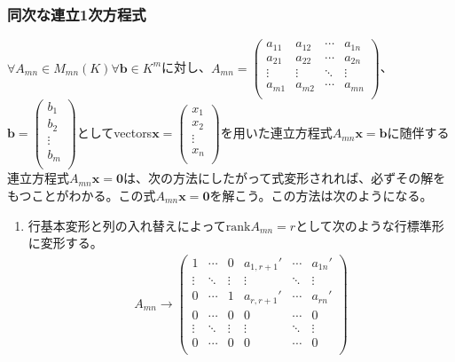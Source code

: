 \documentclass[dvipdfmx]{jsarticle}
\begin{document}
\subsubsection{同次な連立1次方程式}%
\begin{thm}\label{2.1.8.4}
$\forall A_{mn} \in M_{mn}(K)\forall\mathbf{b} \in K^{m}$に対し、$A_{mn} = \begin{pmatrix}
a_{11} & a_{12} & \cdots & a_{1n} \\
a_{21} & a_{22} & \cdots & a_{2n} \\
 \vdots & \vdots & \ddots & \vdots \\
a_{m1} & a_{m2} & \cdots & a_{mn} \\
\end{pmatrix}$、$\mathbf{b} = \begin{pmatrix}
b_{1} \\
b_{2} \\
 \vdots \\
b_{m} \\
\end{pmatrix}$としてvectors$\mathbf{x} = \begin{pmatrix}
x_{1} \\
x_{2} \\
 \vdots \\
x_{n} \\
\end{pmatrix}$を用いた連立方程式$A_{mn}\mathbf{x} = \mathbf{b}$に随伴する連立方程式$A_{mn}\mathbf{x} = \mathbf{0}$は、次の方法にしたがって式変形されれば、必ずその解をもつことがわかる。この式$A_{mn}\mathbf{x} = \mathbf{0}$を解こう。この方法は次のようになる。
\begin{enumerate}
\item
  行基本変形と列の入れ替えによって${\mathrm{rank}}A_{mn} = r$として次のような行標準形に変形する。
\begin{align*}
A_{mn} \rightarrow \begin{pmatrix}
1 & \cdots & 0 & a_{1,r + 1}' & \cdots & a_{1n}' \\
 \vdots & \ddots & \vdots & \vdots & \ddots & \vdots \\
0 & \cdots & 1 & a_{r,r + 1}' & \cdots & a_{rn}' \\
0 & \cdots & 0 & 0 & \cdots & 0 \\
 \vdots & \ddots & \vdots & \vdots & \ddots & \vdots \\
0 & \cdots & 0 & 0 & \cdots & 0 \\
\end{pmatrix}

\end{align*}
\end{enumerate}
\end{thm}
\end{document}
